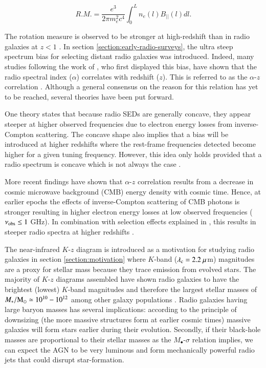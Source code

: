 \begin{equation} 
R.M. = \frac{e^3}{2\pi m_e^2 c^4} \int_0^L n_e(l)B_{||}(l)dl.
\end{equation}

The rotation measure is observed to be stronger at high-redshift than in radio galaxies at $z < 1$  \citep{Saikia1988,Scarrott1990,Tadhunter1992,Jannuzi1991,diSeregoAlighieri1993,
Tran1995,Jannuzi1995,diSeregoAlighieri1996,Jones1996,Feretti1999,Taylor2002,Kaczmarek2018}.
In section \ref{section:early-radio-surveys}, the ultra steep spectrum bias for selecting distant radio galaxies was introduced. Indeed, many studies following the work of \citet{Tielens1979}, who first displayed this bias, have shown that the radio spectral index ($\alpha$) correlates with redshift ($z$). This is referred to as the $\alpha$-$z$ correlation \citep{BlumenthalMiley1979,Chambers1988a,debreuck2002a}. Although a general consensus on the reason for this relation has yet to be reached, several theories have been put forward. 

One theory states that because radio SEDs are generally concave, they appear steeper at higher observed frequencies due to electron energy losses from inverse-Compton scattering. The concave shape also implies that a bias will be introduced at higher redshifts where the rest-frame frequencies detected become higher for a given tuning frequency. However, this idea only holds provided that a radio spectrum is concave which is not always the case \citep{Klamer2006}.  

More recent findings have shown that $\alpha$-$z$ correlation results from a decrease in cosmic microwave background (CMB) energy density with cosmic time. Hence, at earlier epochs the effects of inverse-Compton scattering of CMB photons is stronger resulting in higher electron energy losses at low observed frequencies ($\nu_{\rm obs} \leq 1$ GHz). In combination with selection effects explained in \citet{debreuck2000}, this results in steeper radio spectra at higher redshifts \citep{Morabito2018}.  

The near-infrared $K$-$z$ diagram is introduced as a motivation for studying radio galaxies in section \ref{section:motivation} where $K$-band ($\lambda_{\rm c}=2.2~\mu$m) magnitudes are a proxy for stellar mass because they trace emission from evolved stars. The majority of $K$-$z$ diagrams assembled have shown radio galaxies to have the brightest (lowest) $K$-band magnitudes and therefore the largest stellar masses of $M_*/\rm{M}_\odot \simeq 10^{10} - 10^{12}$ among other galaxy populations \citep{McCarthy1993,jarvis2001,Willott2003,rocca-volmerange2004}. Radio galaxies  having large baryon masses has several implications: according to the principle of downsizing (the more massive structures form at earlier cosmic times) massive galaxies will form stars earlier during their evolution. Secondly, if their black-hole masses are proportional to their stellar masses as the $M_\bullet$-$\sigma$ relation implies, we can expect the AGN to be very luminous and form mechanically powerful radio jets that could disrupt star-formation. 

